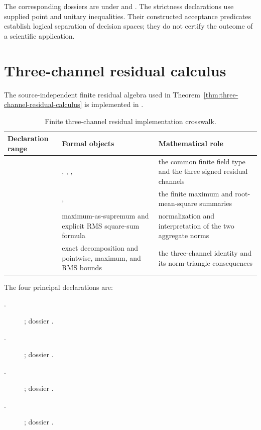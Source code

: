 The corresponding dossiers are under  and
. The strictness declarations use supplied point
and unitary inequalities. Their constructed acceptance predicates establish logical
separation of decision spaces; they do not certify the outcome of a scientific
application.

\section{Three-channel residual calculus}

The source-independent finite residual algebra used in
Theorem~\ref{thm:three-channel-residual-calculus} is implemented in
.

\begin{table}[ht]
\centering
\small
\begin{tabularx}{\textwidth}{@{}Z Y Y@{}}
\toprule
Declaration range & Formal objects & Mathematical role \\
\midrule
{}
  & , ,
    , 
  & the common finite field type and the three signed residual channels \\
  & , 
  & the finite maximum and root-mean-square summaries \\
  & maximum-as-supremum and explicit RMS square-sum formula
  & normalization and interpretation of the two aggregate norms \\
  & exact decomposition and pointwise, maximum, and RMS bounds
  & the three-channel identity and its norm-triangle consequences \\
\bottomrule
\end{tabularx}
\caption{Finite three-channel residual implementation crosswalk.}
\label{tab:three-channel-implementation-crosswalk}
\end{table}

The four principal declarations are:

\begin{description}
  \item[.]
    ;
    dossier .
  \item[.]
    ;
    dossier .
  \item[.]
    ;
    dossier .
  \item[.]
    ;
    dossier .
\end{description}

